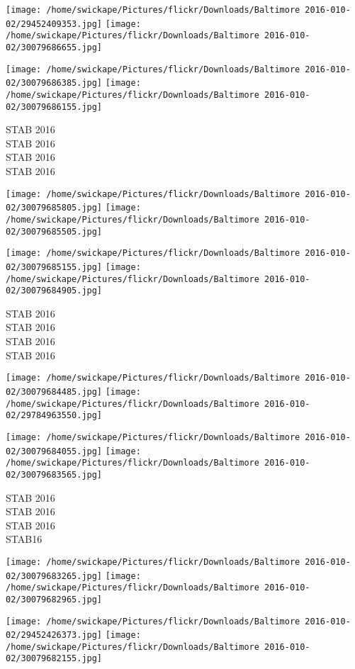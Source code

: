 \documentclass[10pt,letterpaper]{article}
\begin{document}
\texttt{[image: /home/swickape/Pictures/flickr/Downloads/Baltimore 2016-010-02/29452409353.jpg]}
\texttt{[image: /home/swickape/Pictures/flickr/Downloads/Baltimore 2016-010-02/30079686655.jpg]}

\texttt{[image: /home/swickape/Pictures/flickr/Downloads/Baltimore 2016-010-02/30079686385.jpg]}
\texttt{[image: /home/swickape/Pictures/flickr/Downloads/Baltimore 2016-010-02/30079686155.jpg]}

STAB 2016\\
STAB 2016\\
STAB 2016\\
STAB 2016
\pagebreak

\texttt{[image: /home/swickape/Pictures/flickr/Downloads/Baltimore 2016-010-02/30079685805.jpg]}
\texttt{[image: /home/swickape/Pictures/flickr/Downloads/Baltimore 2016-010-02/30079685505.jpg]}

\texttt{[image: /home/swickape/Pictures/flickr/Downloads/Baltimore 2016-010-02/30079685155.jpg]}
\texttt{[image: /home/swickape/Pictures/flickr/Downloads/Baltimore 2016-010-02/30079684905.jpg]}

STAB 2016\\
STAB 2016\\
STAB 2016\\
STAB 2016
\pagebreak

\texttt{[image: /home/swickape/Pictures/flickr/Downloads/Baltimore 2016-010-02/30079684485.jpg]}
\texttt{[image: /home/swickape/Pictures/flickr/Downloads/Baltimore 2016-010-02/29784963550.jpg]}

\texttt{[image: /home/swickape/Pictures/flickr/Downloads/Baltimore 2016-010-02/30079684055.jpg]}
\texttt{[image: /home/swickape/Pictures/flickr/Downloads/Baltimore 2016-010-02/30079683565.jpg]}

STAB 2016\\
STAB 2016\\
STAB 2016\\
STAB16
\pagebreak

\texttt{[image: /home/swickape/Pictures/flickr/Downloads/Baltimore 2016-010-02/30079683265.jpg]}
\texttt{[image: /home/swickape/Pictures/flickr/Downloads/Baltimore 2016-010-02/30079682965.jpg]}

\texttt{[image: /home/swickape/Pictures/flickr/Downloads/Baltimore 2016-010-02/29452426373.jpg]}
\texttt{[image: /home/swickape/Pictures/flickr/Downloads/Baltimore 2016-010-02/30079682155.jpg]}
\end{document}
